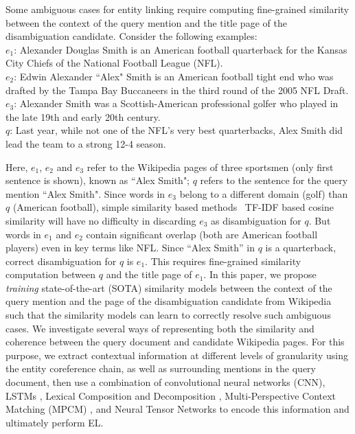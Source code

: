 \documentclass[letterpaper]{article} \usepackage{aaai18}  \usepackage{times}  \usepackage{helvet}  \usepackage{courier}  \usepackage{url}  \usepackage{graphicx}  \frenchspacing  \setlength{\pdfpagewidth}{8.5in}  \setlength{\pdfpageheight}{11in}  \usepackage{latexsym}
\begin{document}
Some ambiguous cases for entity linking require computing fine-grained similarity between the context of the query mention and the title page of the disambiguation candidate. Consider the following examples:\\
$e_1$: Alexander Douglas Smith is an American football quarterback for the Kansas City Chiefs of the National Football League (NFL).\\
$e_2$: Edwin Alexander ``Alex" Smith is an American football tight end who was drafted by the Tampa Bay Buccaneers in the third round of the 2005 NFL Draft.\\
$e_3$: Alexander Smith was a Scottish-American professional golfer who played in the late 19th and early 20th century.\\
$q$: Last year, while not one of the NFL’s very best quarterbacks, Alex Smith did lead the team to a strong 12-4 season.

Here, $e_1$, $e_2$ and $e_3$ refer to the Wikipedia pages of three sportsmen (only first sentence is shown), known as ``Alex Smith"; $q$ refers to the sentence for the query mention ``Alex Smith". Since words in $e_3$ belong to a different domain (golf) than $q$ (American football), simple similarity based methods \eg\ TF-IDF based cosine similarity will have no difficulty in discarding $e_3$ as disambiguation for $q$. But words in $e_1$ and $e_2$ contain significant overlap (both are American football players) even in key terms like NFL. Since ``Alex Smith'' in $q$ is a quarterback, correct disambiguation for $q$ is $e_1$. This requires fine-grained similarity computation between $q$ and the title page of $e_1$. In this paper, we propose \textit{training} state-of-the-art (SOTA) similarity models between the context of the query mention and the page of the disambiguation candidate from Wikipedia such that the similarity models can learn to correctly resolve such ambiguous cases. We investigate several ways of representing both the similarity and coherence between the query document and candidate Wikipedia pages. For this purpose, we extract contextual information at different levels of granularity using the entity coreference chain, as well as surrounding mentions in the query document, then use a combination of convolutional neural networks (CNN), LSTMs \cite{hochreiter1997long}, Lexical Composition and Decomposition \cite{wang2016sentence},  Multi-Perspective Context Matching (MPCM) \cite{wang2016multi}, and Neural Tensor Networks  \cite{socher2013reasoning,socher2013tensor} to encode this information and ultimately perform EL.
\end{document}
